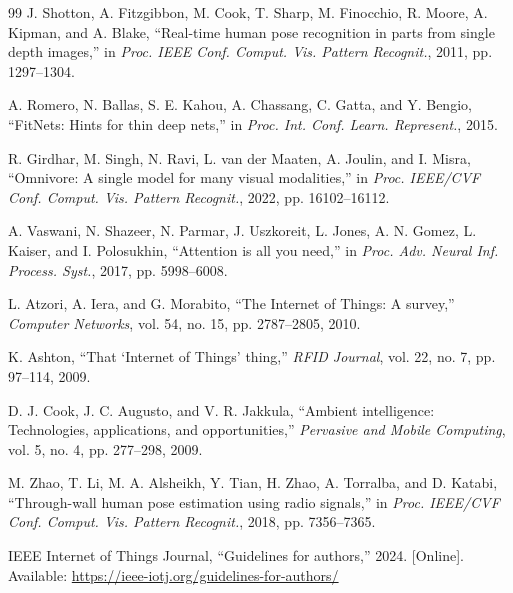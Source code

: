 ﻿\documentclass[journal]{IEEEtran}
\begin{document}
\begin{thebibliography}{99}
J. Shotton, A. Fitzgibbon, M. Cook, T. Sharp, M. Finocchio, R. Moore, A. Kipman, and A. Blake, ``Real-time human pose recognition in parts from single depth images,'' in \emph{Proc. IEEE Conf. Comput. Vis. Pattern Recognit.}, 2011, pp. 1297--1304.

A. Romero, N. Ballas, S. E. Kahou, A. Chassang, C. Gatta, and Y. Bengio, ``FitNets: Hints for thin deep nets,'' in \emph{Proc. Int. Conf. Learn. Represent.}, 2015.

R. Girdhar, M. Singh, N. Ravi, L. van der Maaten, A. Joulin, and I. Misra, ``Omnivore: A single model for many visual modalities,'' in \emph{Proc. IEEE/CVF Conf. Comput. Vis. Pattern Recognit.}, 2022, pp. 16102--16112.

A. Vaswani, N. Shazeer, N. Parmar, J. Uszkoreit, L. Jones, A. N. Gomez, L. Kaiser, and I. Polosukhin, ``Attention is all you need,'' in \emph{Proc. Adv. Neural Inf. Process. Syst.}, 2017, pp. 5998--6008.

L. Atzori, A. Iera, and G. Morabito, ``The Internet of Things: A survey,'' \emph{Computer Networks}, vol. 54, no. 15, pp. 2787--2805, 2010.

K. Ashton, ``That `Internet of Things' thing,'' \emph{RFID Journal}, vol. 22, no. 7, pp. 97--114, 2009.

D. J. Cook, J. C. Augusto, and V. R. Jakkula, ``Ambient intelligence: Technologies, applications, and opportunities,'' \emph{Pervasive and Mobile Computing}, vol. 5, no. 4, pp. 277--298, 2009.

M. Zhao, T. Li, M. A. Alsheikh, Y. Tian, H. Zhao, A. Torralba, and D. Katabi, ``Through-wall human pose estimation using radio signals,'' in \emph{Proc. IEEE/CVF Conf. Comput. Vis. Pattern Recognit.}, 2018, pp. 7356--7365.

IEEE Internet of Things Journal, ``Guidelines for authors,'' 2024. [Online]. Available: \url{https://ieee-iotj.org/guidelines-for-authors/}

\end{thebibliography}
\end{document}
